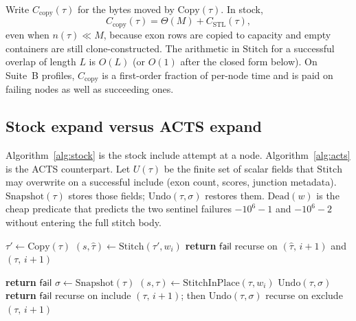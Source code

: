 \documentclass[11pt]{article}
\newcommand{\ACTS}{ACTS\xspace}
\begin{document}
Write $C_{\mathrm{copy}}(\tau)$ for the bytes moved by $\mathrm{Copy}(\tau)$.
In stock,
\begin{equation}
\label{eq:copy-cost}
C_{\mathrm{copy}}(\tau)=\Theta(M)+C_{\mathrm{STL}}(\tau),
\end{equation}
even when $n(\tau)\ll M$, because exon rows are copied to capacity and empty
containers are still clone-constructed.
The arithmetic in $\mathrm{Stitch}$ for a successful overlap of length $L$ is
$O(L)$ (or $O(1)$ after the closed form below).
On Suite~B profiles, $C_{\mathrm{copy}}$ is a first-order fraction of per-node
time and is paid on failing nodes as well as succeeding ones.

\subsection{Stock expand versus \ACTS expand}
\label{sec:algs}

Algorithm~\ref{alg:stock} is the stock include attempt at a node.
Algorithm~\ref{alg:acts} is the \ACTS counterpart.
Let $U(\tau)$ be the finite set of scalar fields that $\mathrm{Stitch}$ may
overwrite on a successful include (exon count, scores, junction metadata).
$\mathrm{Snapshot}(\tau)$ stores those fields; $\mathrm{Undo}(\tau,\sigma)$
restores them.
$\mathrm{Dead}(w)$ is the cheap predicate that predicts the two sentinel
failures $-10^{6}{-}1$ and $-10^{6}{-}2$ without entering the full stitch body.

\begin{algorithm}[t]
\caption{Stock include attempt at node $(\tau,i)$}
\label{alg:stock}
\begin{algorithmic}[1]
  \State $\tau' \gets \mathrm{Copy}(\tau)$
  \State $(s,\hat\tau) \gets \mathrm{Stitch}(\tau',w_i)$
    \State \textbf{return} $\mathsf{fail}$
  \Else
    \State recurse on $(\hat\tau,\,i{+}1)$ and $(\tau,\,i{+}1)$
  \EndIf
\EndProcedure
\end{algorithmic}
\end{algorithm}

\begin{algorithm}[t]
\caption{\ACTS include attempt at node $(\tau,i)$ (rungs S1--S3b, S5)}
\label{alg:acts}
\begin{algorithmic}[1]
    \State \textbf{return} $\mathsf{fail}$
  \EndIf
  \State $\sigma \gets \mathrm{Snapshot}(\tau)$
  \State $(s,\tau) \gets \mathrm{StitchInPlace}(\tau,w_i)$
    \State $\mathrm{Undo}(\tau,\sigma)$
    \State \textbf{return} $\mathsf{fail}$
  \Else
    \State recurse on include $(\tau,\,i{+}1)$; then $\mathrm{Undo}(\tau,\sigma)$
    \State recurse on exclude $(\tau,\,i{+}1)$
  \EndIf
\EndProcedure
\end{algorithmic}
\end{algorithm}
\end{document}
